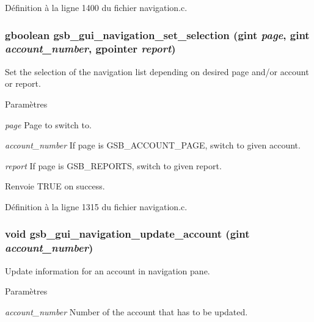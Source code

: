 Définition à la ligne 1400 du fichier navigation.c.

\subsubsection[{gsb\_\-gui\_\-navigation\_\-set\_\-selection}]{\setlength{\rightskip}{0pt plus 5cm}gboolean gsb\_\-gui\_\-navigation\_\-set\_\-selection (gint {\em page}, \/  gint {\em account\_\-number}, \/  gpointer {\em report})}\label{navigation_8h_a3fb9bd34026d724eefe1309fb63bf8fc}
Set the selection of the navigation list depending on desired page and/or account or report.


\begin{DoxyParams}{Paramètres}
\item[{\em page}]Page to switch to. \item[{\em account\_\-number}]If page is GSB\_\-ACCOUNT\_\-PAGE, switch to given account. \item[{\em report}]If page is GSB\_\-REPORTS, switch to given report.\end{DoxyParams}
\begin{DoxyReturn}{Renvoie}
TRUE on success. 
\end{DoxyReturn}


Définition à la ligne 1315 du fichier navigation.c.

\subsubsection[{gsb\_\-gui\_\-navigation\_\-update\_\-account}]{\setlength{\rightskip}{0pt plus 5cm}void gsb\_\-gui\_\-navigation\_\-update\_\-account (gint {\em account\_\-number})}\label{navigation_8h_adcd317bee4b886a4eafb93112f65042e}
Update information for an account in navigation pane.


\begin{DoxyParams}{Paramètres}
\item[{\em account\_\-number}]Number of the account that has to be updated. \end{DoxyParams}


